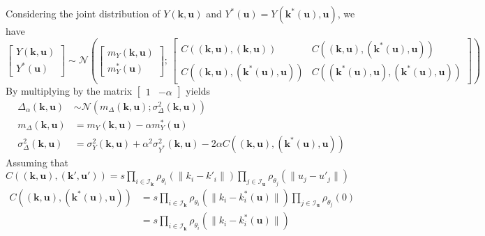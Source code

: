 \documentclass[a4paper,11pt]{article}
\theoremstyle{defi}
\numberwithin{thmCounter}{section}
\begin{document}
Considering the joint distribution of $Y(\mathbf{k},\mathbf{u})$ and $Y^*(\mathbf{u}) = Y(\mathbf{k}^*(\mathbf{u}), \mathbf{u})$, we have
\begin{equation}
  \begin{bmatrix}
    Y(\mathbf{k},\mathbf{u}) \\
    Y^*(\mathbf{u})
  \end{bmatrix}
  \sim \mathcal{N}\left(
    \begin{bmatrix}
      m_Y(\mathbf{k},\mathbf{u}) \\
      m_Y^*(\mathbf{u})
    \end{bmatrix}
    ;\,
    \begin{bmatrix}
      C\left((\mathbf{k},\mathbf{u}),(\mathbf{k},\mathbf{u})\right) & C\left((\mathbf{k},\mathbf{u}),(\mathbf{k}^*(\mathbf{u}),\mathbf{u})\right) \\
      C\left((\mathbf{k},\mathbf{u}),(\mathbf{k}^*(\mathbf{u}),\mathbf{u})\right) & C\left((\mathbf{k}^*(\mathbf{u}),\mathbf{u}),(\mathbf{k}^*(\mathbf{u}),\mathbf{u})\right)
    \end{bmatrix}
\right)
\end{equation}
By multiplying by the matrix $\begin{bmatrix}1 & -\alpha \end{bmatrix}$ yields
\begin{align}
  \Delta_{\alpha}(\mathbf{k},\mathbf{u}) &\sim \mathcal{N}\left(m_{\Delta}(\mathbf{k},\mathbf{u}); \sigma^2_{\Delta}(\mathbf{k},\mathbf{u})\right) \\
  m_{\Delta}(\mathbf{k},\mathbf{u}) &= m_Y(\mathbf{k},\mathbf{u}) - \alpha m_Y^*(\mathbf{u}) \\
  \sigma^2_{\Delta}(\mathbf{k},\mathbf{u}) &= \sigma_Y^2(\mathbf{k},\mathbf{u}) + \alpha^2 \sigma_{Y^*}^2(\mathbf{k},\mathbf{u}) - 2\alpha C\left((\mathbf{k},\mathbf{u}),(\mathbf{k}^*(\mathbf{u}),\mathbf{u})\right)
\end{align}
Assuming that $C((\mathbf{k},\mathbf{u}), (\mathbf{k}',\mathbf{u}')) = s \prod_{i\in\mathcal{I}_{\mathbf{k}}}\rho_{\theta_i}(\|k_i - k'_i\|) \prod_{j\in\mathcal{I}_{\mathbf{u}}} \rho_{\theta_j}(\|u_j - u'_j\|)$
\begin{align}
  C\left((\mathbf{k},\mathbf{u}),(\mathbf{k}^*(\mathbf{u}),\mathbf{u})\right) &= s \prod_{i\in\mathcal{I}_{\mathbf{k}}}\rho_{\theta_i}(\|k_i - k^*_i(\mathbf{u})\|)\prod_{j\in\mathcal{I}_{\mathbf{u}}} \rho_{\theta_j}(0) \\
  &=s \prod_{i\in\mathcal{I}_{\mathbf{k}}}\rho_{\theta_i}(\|k_i - k^*_i(\mathbf{u})\|)
\end{align}
\end{document}
